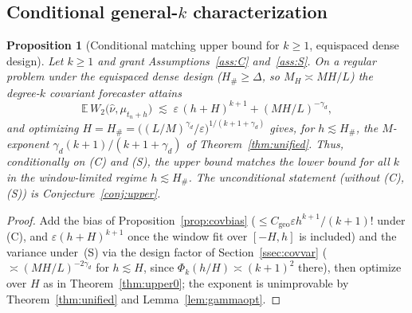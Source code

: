 \documentclass[11pt]{article}
\newtheorem{proposition}{Proposition}
\theoremstyle{definition}
\theoremstyle{remark}
\newcommand{\E}{\mathbb{E}}
\begin{document}
\subsection{Conditional general-$k$ characterization}\label{ssec:covthm}
\begin{proposition}[Conditional matching upper bound for $k\ge1$, equispaced dense design]\label{prop:covariant}
Let $k\ge1$ and grant Assumptions~\ref{ass:C} and~\ref{ass:S}. On a regular problem under the
equispaced dense design ($H_\#\ge\Delta$, so $M_H\asymp MH/L$) the degree-$k$
covariant forecaster attains
\[
   \E\,W_2\big(\widehat\nu,\mu_{t_n+h}\big)\;\lesssim\;\varepsilon\,(h+H)^{k+1}+(MH/L)^{-\gamma_d},
\]
and optimizing $H=H_\#=\big((L/M)^{\gamma_d}/\varepsilon\big)^{1/(k+1+\gamma_d)}$ gives, for
$h\lesssim H_\#$, the $M$-exponent $\gamma_d(k+1)/(k+1+\gamma_d)$ of Theorem~\ref{thm:unified}. Thus,
\emph{conditionally on (C) and (S)}, the upper bound matches the lower bound for all $k$ in the
window-limited regime $h\lesssim H_\#$. The unconditional statement (without (C),(S)) is
Conjecture~\ref{conj:upper}.
\end{proposition}
\begin{proof}
Add the bias of Proposition~\ref{prop:covbias} ($\le C_{\mathrm{geo}}\varepsilon h^{k+1}/(k+1)!$ under
(C), and $\varepsilon(h+H)^{k+1}$ once the window fit over $[-H,h]$ is included) and the variance
under~(S) via the design factor of Section~\ref{ssec:covvar} ($\asymp(MH/L)^{-2\gamma_d}$ for
$h\lesssim H$, since $\Phi_k(h/H)\asymp(k+1)^2$ there), then optimize over $H$ as in
Theorem~\ref{thm:upper0}; the exponent is unimprovable by Theorem~\ref{thm:unified} and
Lemma~\ref{lem:gammaopt}.
\end{proof}
\end{document}

